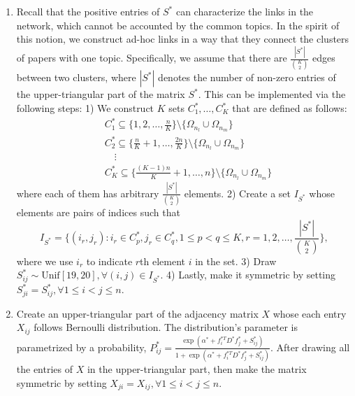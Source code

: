 \documentclass[AMS,STIX1COL]{WileyNJD-v2}
\begin{document}
{\begin{enumerate}
    \item Recall that the positive entries of $S^*$ can characterize the links in the network, which cannot be accounted by the common topics.
        In the spirit of this notion, we construct ad-hoc links in a way that they connect the clusters of papers with one topic.
        Specifically, we assume that there are $\frac{|S^*|}{\binom{K}{2}}$ edges between two clusters, where $|S^*|$ denotes the number of non-zero entries of the upper-triangular part of the matrix $S^*$.
        This can be implemented via the following steps:
        1) We construct $K$ sets $C^*_1,\dots,C^*_K$ that are defined as follows:
        \begin{align*}
           &C^*_{1} \subseteq \big\{1, 2, \dots, \frac{n}{K} \big\} \setminus \big\{ \Omega_{n_l}
           \cup \Omega_{n_m} \big\} \\
           &C^*_{2} \subseteq \big\{\frac{n}{K}+1, \dots, \frac{2n}{K} \big\} \setminus \big\{ \Omega_{n_l} \cup \Omega_{n_m} \big\}  \\
           & \quad \vdots \\
           &C^*_{K} \subseteq \big\{\frac{(K-1)n}{K}+1, \dots, n \big\} \setminus \big\{ \Omega_{n_l}
           \cup \Omega_{n_m} \big\}
        \end{align*}
        where each of them has arbitrary $\frac{|S^*|}{\binom{K}{2}}$ elements.
        2) Create a set $I_{S^*}$ whose elements are pairs of indices such that
        \[
            I_{S^*} =
            \bigg\{ (i_r,j_r) : i_r \in C^*_p, j_r \in C^*_q, 1 \leq p < q \leq K,   r = 1,2,\dots,\frac{|S^*|}{\binom{K}{2}} \bigg\},
        \]
        where we use $i_r$ to indicate $r$th element $i$ in the set.
        3) Draw $S^*_{ij} \sim \mbox{Unif}[19,20], \forall (i,j) \in I_{S^*}$.
        4) Lastly, make it symmetric by setting $S^*_{ji}=S^*_{ij},\forall 1\leq i < j \leq n$.
    \item Create an upper-triangular part of the adjacency matrix $X$ whose each entry $X_{ij}$ follows Bernoulli distribution.
        The distribution's parameter is parametrized by a probability, $P^{*}_{ij}=\frac{\exp (\alpha^{*}+f^{*T}_{i}D^{*}f^{*}_{j} +  S^{*}_{ij})}{1+\exp(\alpha^{*}+f^{*T}_{i}D^{*}f^{*}_{j} +  S^{*}_{ij})}$.
        After drawing all the entries of $X$ in the upper-triangular part, then make the matrix symmetric by setting $X_{ji}=X_{ij},\forall 1 \leq i < j \leq n$.
\end{enumerate}


}
\end{document}
